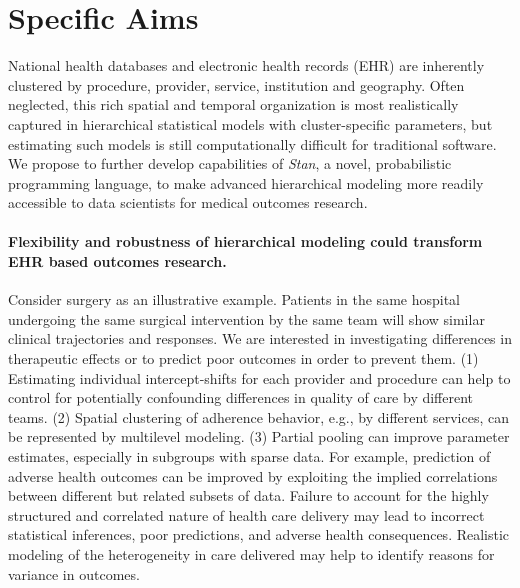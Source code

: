 \documentclass[11pt,notitlepage]{article}
\begin{document}
\section*{Specific Aims}
National health databases and electronic health records (EHR) are inherently 
clustered by procedure, provider, service, institution and geography. Often 
neglected, this rich spatial and temporal organization is most realistically 
captured in hierarchical statistical models with cluster-specific parameters, but 
estimating such models is still computationally difficult for traditional software. 
We propose to further develop capabilities of \textit{Stan}, a novel, probabilistic 
programming language, to make advanced hierarchical modeling more readily accessible 
to data scientists for medical outcomes research. 

\paragraph*{Flexibility and robustness of hierarchical modeling could 
transform EHR based outcomes research.} Consider surgery as an 
illustrative example. Patients in the same hospital undergoing the 
same surgical intervention by the same team will show similar clinical 
trajectories and responses. We are interested in investigating
differences in therapeutic effects or to predict poor outcomes in order to prevent 
them. (1) Estimating individual intercept-shifts for each provider and procedure
can help to control for potentially confounding differences 
in quality of care by different teams. (2) Spatial clustering of adherence 
behavior, e.g., by different services, can be represented by multilevel modeling. 
(3) Partial pooling can improve parameter estimates, especially in subgroups with sparse data.
For example, prediction of adverse health outcomes can be 
improved by exploiting the implied correlations between different but related subsets of data. 
Failure to account for the highly structured and correlated nature of health care delivery may lead 
to incorrect statistical inferences, poor predictions, and adverse health consequences. 
Realistic modeling of the heterogeneity in  care delivered may help to identify reasons for variance in outcomes.
\end{document}
